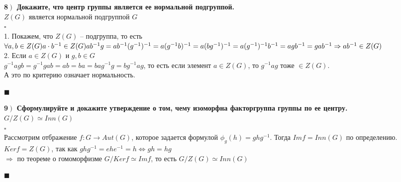 \documentclass[a4paper,12pt]{article}
\begin{document}
    \textbf{8$\left.\right)$ Докажите, что центр группы является ее нормальной подгруппой.}\\$Z(G)$ является нормальной подгруппой $G$\\
    $\square$\\
    1. Покажем, что $Z(G)$ -- подгруппа, то есть $\forall a, b\in Z(G) a\cdot b^{-1}\in Z(G)\\
    ab^{-1}g=ab^{-1}(g^{-1})^{-1}=a(g^{-1}b)^{-1}=a(bg^{-1})^{-1}=a(g^{-1})^{-1}b^{-1}=agb^{-1}=gab^{-1}\Rightarrow ab^{-1}\in Z(G)$\\
    2. Если $a\in Z(G)$ и $g, b\in G$\\
    $g^{-1}agb=g^{-1}gab=ab=ba=bag^{-1}g=bg^{-1}ag$, то есть если элемент $a\in Z(G)$, то $g^{-1}ag$ тоже $\in Z(G)$.\\
    А это по критерию означает нормальность.
    \begin{flushright}
        $\blacksquare$
    \end{flushright}

    \textbf{9$\left.\right)$ Сформулируйте и докажите утверждение о том, чему изоморфна факторгруппа группы по ее центру.}\\$G/Z(G)\simeq Inn(G)$\\
    $\square$\\
    Рассмотрим отбражение $f:G\rightarrow Aut(G)$, которое задается формулой $\phi_g(h)=ghg^{-1}$. Тогда $Im f=Inn(G)$ по определению. $Ker f=Z(G)$, так как $ghg^{-1}=ehe^{-1}=h\Leftrightarrow gh=hg$\\
    $\Rightarrow$ по теореме о гомоморфизме $G/Ker f\simeq Im f$, то есть $G/Z(G)\simeq Inn(G)$
    \begin{flushright}
        $\blacksquare$
    \end{flushright}
\end{document}
